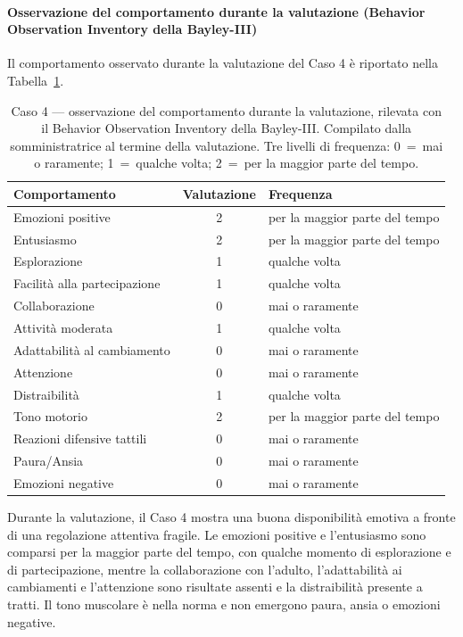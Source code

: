  \paragraph*{Osservazione del comportamento durante la valutazione (Behavior Observation Inventory della Bayley-III)}

Il comportamento osservato durante la valutazione del Caso 4 è riportato nella Tabella~\ref{tab:caso4_boi}.

\begin{table}[htbp]
\centering
\caption[Caso 4 --- osservazione del comportamento durante la valutazione]{Caso 4 --- osservazione del comportamento durante la valutazione, rilevata con il Behavior Observation Inventory della Bayley-III. Compilato dalla somministratrice al termine della valutazione. Tre livelli di frequenza: 0~=~mai o raramente; 1~=~qualche volta; 2~=~per la maggior parte del tempo.}
\label{tab:caso4_boi}
\begin{tabular}{|l|c|l|}
\toprule
\textbf{Comportamento} & \textbf{Valutazione} & \textbf{Frequenza} \\
\midrule
Emozioni positive & 2 & per la maggior parte del tempo \\
Entusiasmo & 2 & per la maggior parte del tempo \\
Esplorazione & 1 & qualche volta \\
Facilità alla partecipazione & 1 & qualche volta \\
Collaborazione & 0 & mai o raramente \\
Attività moderata & 1 & qualche volta \\
Adattabilità al cambiamento & 0 & mai o raramente \\
Attenzione & 0 & mai o raramente \\
Distraibilità & 1 & qualche volta \\
Tono motorio & 2 & per la maggior parte del tempo \\
Reazioni difensive tattili & 0 & mai o raramente \\
Paura/Ansia & 0 & mai o raramente \\
Emozioni negative & 0 & mai o raramente \\
\bottomrule
\end{tabular}
\end{table}

Durante la valutazione, il Caso 4 mostra una buona disponibilità emotiva a fronte di una regolazione attentiva fragile. Le emozioni positive e l'entusiasmo sono comparsi per la maggior parte del tempo, con qualche momento di esplorazione e di partecipazione, mentre la collaborazione con l'adulto, l'adattabilità ai cambiamenti e l'attenzione sono risultate assenti e la distraibilità presente a tratti. Il tono muscolare è nella norma e non emergono paura, ansia o emozioni negative.

